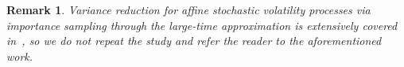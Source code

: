 \documentclass{amsart}[11pt]
\numberwithin{equation}{section}
\numberwithin{theorem}{subsection}
\numberwithin{proposition}{subsection}
\numberwithin{definition}{subsection}
\numberwithin{lemma}{subsection}
\newtheorem*{remark}{Remark}
\numberwithin{assumption}{subsection}
\newcommand{\EE}{\mathbb{E}}
\newcommand{\D}{\mathrm{d}}
\newcommand{\E}{\mathrm{e}}
\begin{document}
\begin{remark}
Variance reduction for affine stochastic volatility processes via importance sampling through the large-time approximation is extensively covered in~\cite{Grbac2021}, so we do not repeat the study and refer the reader to the aforementioned work.
\end{remark}



\end{document}
